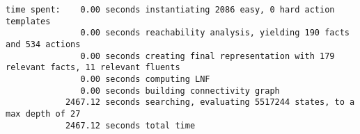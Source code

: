 \documentclass{article}
\begin{document}
\begin{lstlisting}
time spent:    0.00 seconds instantiating 2086 easy, 0 hard action templates
               0.00 seconds reachability analysis, yielding 190 facts and 534 actions
               0.00 seconds creating final representation with 179 relevant facts, 11 relevant fluents
               0.00 seconds computing LNF
               0.00 seconds building connectivity graph
            2467.12 seconds searching, evaluating 5517244 states, to a max depth of 27
            2467.12 seconds total time
\end{lstlisting}
	
\end{document}
